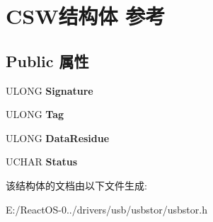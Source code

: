 \hypertarget{struct_c_s_w}{}\section{C\+S\+W结构体 参考}
\label{struct_c_s_w}
\subsection*{Public 属性}
\begin{DoxyCompactItemize}
\item 
\mbox{\label{struct_c_s_w_a15677feeb10f274dd2276aeb6ce675c4}} 
U\+L\+O\+NG {\bfseries Signature}
\item 
\mbox{\label{struct_c_s_w_a63add7dcc95adc3896c88a360140121e}} 
U\+L\+O\+NG {\bfseries Tag}
\item 
\mbox{\label{struct_c_s_w_a3dbdd36d1e43907a3f6c7e281c8d3b65}} 
U\+L\+O\+NG {\bfseries Data\+Residue}
\item 
\mbox{\label{struct_c_s_w_af9c0cab1a4d89b24ee4cf81e747c3756}} 
U\+C\+H\+AR {\bfseries Status}
\end{DoxyCompactItemize}


该结构体的文档由以下文件生成\+:\begin{DoxyCompactItemize}
\item 
E\+:/\+React\+O\+S-\/0../drivers/usb/usbstor/usbstor.\+h\end{DoxyCompactItemize}
